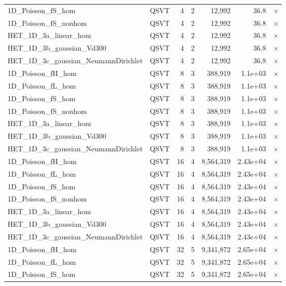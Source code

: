 \begin{table}[htbp]
\begin{tabular}{llrrrrl}
    1D\_Poisson\_fS\_hom & QSVT & 4 & 2 & 12,992 & 36.8 & $\times$ \\
    1D\_Poisson\_fS\_nonhom & QSVT & 4 & 2 & 12,992 & 36.8 & $\times$ \\
    HET\_1D\_3a\_linear\_hom & QSVT & 4 & 2 & 12,992 & 36.8 & $\times$ \\
    HET\_1D\_3b\_gaussian\_Vd300 & QSVT & 4 & 2 & 12,992 & 36.8 & $\times$ \\
    HET\_1D\_3c\_gaussian\_NeumannDirichlet & QSVT & 4 & 2 & 12,992 & 36.8 & $\times$ \\
    1D\_Poisson\_fH\_hom & QSVT & 8 & 3 & 388,919 & 1.1e+03 & $\times$ \\
    1D\_Poisson\_fL\_hom & QSVT & 8 & 3 & 388,919 & 1.1e+03 & $\times$ \\
    1D\_Poisson\_fS\_hom & QSVT & 8 & 3 & 388,919 & 1.1e+03 & $\times$ \\
    1D\_Poisson\_fS\_nonhom & QSVT & 8 & 3 & 388,919 & 1.1e+03 & $\times$ \\
    HET\_1D\_3a\_linear\_hom & QSVT & 8 & 3 & 388,919 & 1.1e+03 & $\times$ \\
    HET\_1D\_3b\_gaussian\_Vd300 & QSVT & 8 & 3 & 388,919 & 1.1e+03 & $\times$ \\
    HET\_1D\_3c\_gaussian\_NeumannDirichlet & QSVT & 8 & 3 & 388,919 & 1.1e+03 & $\times$ \\
    1D\_Poisson\_fH\_hom & QSVT & 16 & 4 & 8,564,319 & 2.43e+04 & $\times$ \\
    1D\_Poisson\_fL\_hom & QSVT & 16 & 4 & 8,564,319 & 2.43e+04 & $\times$ \\
    1D\_Poisson\_fS\_hom & QSVT & 16 & 4 & 8,564,319 & 2.43e+04 & $\times$ \\
    1D\_Poisson\_fS\_nonhom & QSVT & 16 & 4 & 8,564,319 & 2.43e+04 & $\times$ \\
    HET\_1D\_3a\_linear\_hom & QSVT & 16 & 4 & 8,564,319 & 2.43e+04 & $\times$ \\
    HET\_1D\_3b\_gaussian\_Vd300 & QSVT & 16 & 4 & 8,564,319 & 2.43e+04 & $\times$ \\
    HET\_1D\_3c\_gaussian\_NeumannDirichlet & QSVT & 16 & 4 & 8,564,319 & 2.43e+04 & $\times$ \\
    1D\_Poisson\_fH\_hom & QSVT & 32 & 5 & 9,341,872 & 2.65e+04 & $\times$ \\
    1D\_Poisson\_fL\_hom & QSVT & 32 & 5 & 9,341,872 & 2.65e+04 & $\times$ \\
    1D\_Poisson\_fS\_hom & QSVT & 32 & 5 & 9,341,872 & 2.65e+04 & $\times$ \\

\end{tabular}
\end{table}
